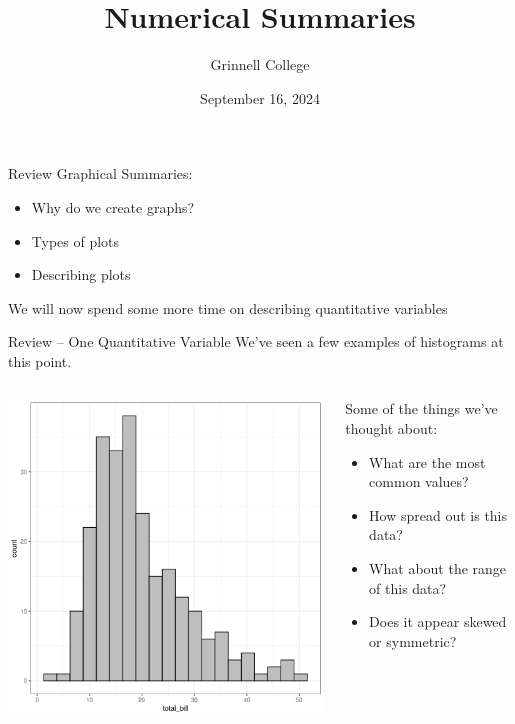 \documentclass{beamer}
\title[SST-115 / STA-209]{Numerical Summaries}
\subtitle{}
\author{Grinnell College}
\date{September 16, 2024}
\begin{document}
\begin{frame}
  \titlepage
\end{frame}


\begin{frame}{Review}
Graphical Summaries:
\begin{itemize}
\item Why do we create graphs?
\item Types of plots
\item Describing plots
\end{itemize}
\vspace{4mm}

We will now spend some more time on describing quantitative variables
\end{frame}



\begin{frame}{Review -- One Quantitative Variable}
We've seen a few examples of histograms at this point.
\begin{columns}
  \begin{column}{0.45\textwidth}
	\begin{center}
	\includegraphics[scale=0.35]{img/bill_bin_20.png}
	\end{center}
  \end{column}
  \begin{column}{0.45\textwidth}
	Some of the things we've thought about:
	\begin{itemize}
	\item What are the most common values?
	\item How spread out is this data?
	\item What about the range of this data?
	\item Does it appear skewed or symmetric?
	\end{itemize}
  \end{column}

\end{columns}
\end{frame}
\end{document}

